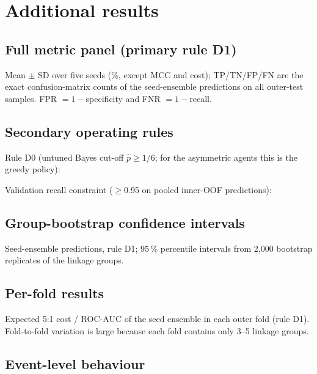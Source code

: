 \section{Additional results}
\label{sec:s-results}

\subsection{Full metric panel (primary rule D1)}
Mean $\pm$ SD over five seeds (\%, except MCC and cost); TP/TN/FP/FN are the exact confusion-matrix counts of the seed-ensemble predictions on all \nSamplesEval{} outer-test samples. FPR $=1-$specificity and FNR $=1-$recall.

\noindent\resizebox{\textwidth}{!}{}

\subsection{Secondary operating rules}
Rule D0 (untuned Bayes cut-off $\hat p\ge 1/6$; for the asymmetric agents this is the greedy policy):

\noindent\resizebox{\textwidth}{!}{}

\medskip
Validation recall constraint ($\ge$0.95 on pooled inner-OOF predictions):

\noindent\resizebox{\textwidth}{!}{}

\subsection{Group-bootstrap confidence intervals}
Seed-ensemble predictions, rule D1; 95\,\% percentile intervals from 2,000 bootstrap replicates of the \nGroupsEval{} linkage groups.

\noindent\resizebox{\textwidth}{!}{}

\subsection{Per-fold results}
Expected 5:1 cost / ROC-AUC of the seed ensemble in each outer fold (rule D1). Fold-to-fold variation is large because each fold contains only 3--5 linkage groups.

\noindent\resizebox{\textwidth}{!}{}

\subsection{Event-level behaviour}
\noindent\resizebox{\textwidth}{!}{}


